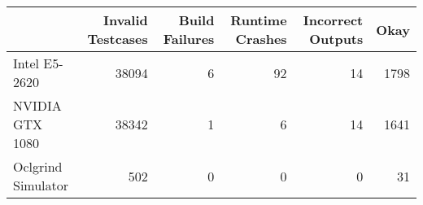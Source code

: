 \begin{tabular}{lrrrrr}
\toprule
{} &  Invalid Testcases &  Build Failures &  Runtime Crashes &  Incorrect Outputs &  Okay \\
\midrule
Intel E5-2620      &              38094 &               6 &               92 &                 14 &  1798 \\
NVIDIA GTX 1080    &              38342 &               1 &                6 &                 14 &  1641 \\
Oclgrind Simulator &                502 &               0 &                0 &                  0 &    31 \\
\bottomrule
\end{tabular}
